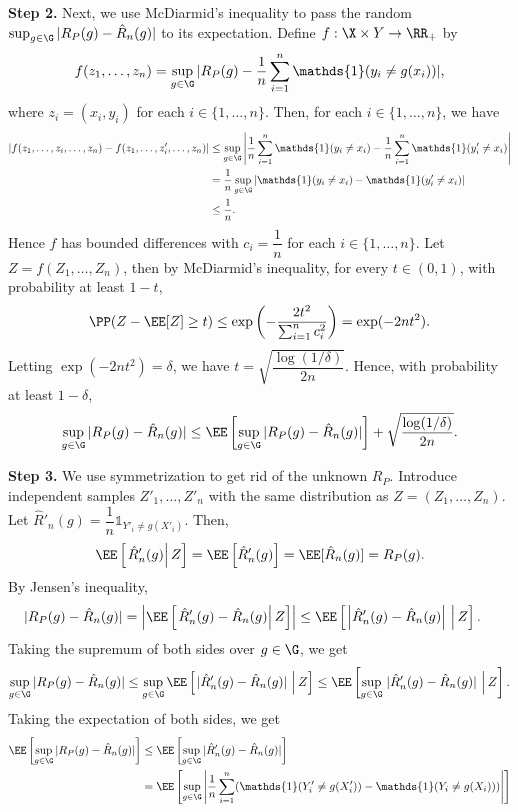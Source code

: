 \textbf{Step 2.} Next, we use McDiarmid's inequality to pass the random $\sup_{g\in\G}|R_P(g) - \hat{R}_n(g)|$ to its expectation. Define $f:\X\times Y \to \RR_+$ by
$$f(z_1,\ldots,z_n) = \sup_{g\in\G}|R_P(g) - \dfrac{1}{n}\sum_{i=1}^n \mathds{1}(y_i\ne g(x_i))|,$$
where $z_i=(x_i,y_i)$ for each $i\in\{1,\ldots,n\}$. Then, for each $i\in\{1,\ldots,n\}$, we have
\begin{align*}
  |f(z_1,\ldots,z_i,\ldots,z_n) - f(z_1,\ldots,z_i',\ldots,z_n)| & \le \sup_{g\in\G}\left|\dfrac{1}{n}\sum_{i=1}^n \mathds{1}(y_i\ne x_i) - \dfrac{1}{n}\sum_{i=1}^n \mathds{1}(y_i'\ne x_i)\right| \\
                                                                 & = \dfrac{1}{n}\sup_{g\in\G}|\mathds{1}(y_i\ne x_i) - \mathds{1}(y_i'\ne x_i)|                                                    \\
                                                                 & \le \dfrac{1}{n}.
\end{align*}
Hence $f$ has bounded differences with $c_i = \dfrac{1}{n}$ for each $i\in\{1,\ldots,n\}$. Let $Z=f(Z_1,\ldots, Z_n)$, then by McDiarmid's inequality, for every $t\in(0,1)$, with probability at least $1-t$,
$$\PP(Z- \EE[Z] \ge t) \le \exp\left(-\frac{2t^2}{\sum_{i=1}^n c_i^2}\right) = \exp(-2nt^2).$$
Letting $\exp(-2nt^2) = \delta$, we have $t = \sqrt{\dfrac{\log(1/\delta)}{2n}}$. Hence, with probability at least $1-\delta$,
$$\sup_{g\in\G}|R_P(g) - \hat{R}_n(g)| \le \EE\left[\sup_{g\in\G}|R_P(g) - \hat{R}_n(g)|\right] + \sqrt{\dfrac{\log(1/\delta)}{2n}}.$$

\textbf{Step 3.} We use symmetrization to get rid of the unknown $R_P$. Introduce independent samples $Z'_1,\ldots,Z'_n$ with the same distribution as $Z=(Z_1,\ldots,Z_n)$. Let $\hat{R}'_n(g)=\dfrac{1}{n}\mathds{1}_{Y'_i\ne g(X'_i)}$. Then,
$$\EE\left[\left.\hat{R}'_n(g)\right| Z\right] = \EE\left[\hat{R}'_n(g) \right]=\EE[\hat{R}_n(g)] = R_P(g).$$
By Jensen's inequality,
\begin{align*}
  |R_P(g) - \hat{R}_n(g)|
   & = \left|\EE\left[\left.\hat{R}'_n(g)-\hat{R}_n(g)\right| Z\right]\right| \le \EE\left[\left.\left|\hat{R}'_n(g)-\hat{R}_n(g)\right|\,\,\right|Z\right].
\end{align*}
Taking the supremum of both sides over $g\in\G$, we get
$$\sup_{g\in\G}|R_P(g) - \hat{R}_n(g)| \le \sup_{g\in\G}\EE\left[\left.|\hat{R}'_n(g)-\hat{R}_n(g)|\,\,\right|Z\right] \le \EE\left[\sup_{g\in\G}\left.|\hat{R}'_n(g)-\hat{R}_n(g)|\,\,\right|Z\right].$$
Taking the expectation of both sides, we get
\begin{align*}
  \EE\left[\sup_{g\in\G}|R_P(g) - \hat{R}_n(g)|\right]
   & \le \EE\left[\sup_{g\in\G}|\hat{R}'_n(g)-\hat{R}_n(g)|\right]                                                                    \\
   & = \EE\left[\sup_{g\in\G}\left|\dfrac{1}{n}\sum_{i=1}^n (\mathds{1}(Y'_i \ne g(X'_i)) - \mathds{1}(Y_i \ne g(X_i)))\right|\right]
\end{align*}

